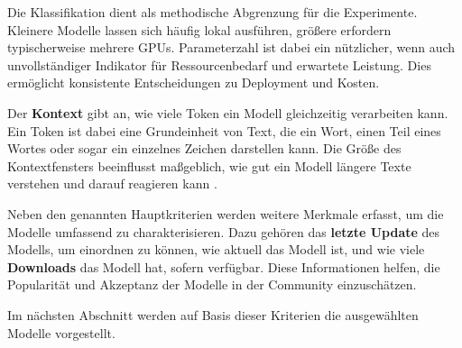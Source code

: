 Die Klassifikation dient als methodische Abgrenzung für die Experimente. Kleinere Modelle lassen sich häufig lokal ausführen, größere erfordern typischerweise mehrere GPUs. Parameterzahl ist dabei ein nützlicher, wenn auch unvollständiger Indikator für Ressourcenbedarf und erwartete Leistung. Dies ermöglicht konsistente Entscheidungen zu Deployment und Kosten.

Der \textbf{Kontext} gibt an, wie viele Token ein Modell gleichzeitig verarbeiten kann. Ein Token ist dabei eine Grundeinheit von Text, die ein Wort, einen Teil eines Wortes oder sogar ein einzelnes Zeichen darstellen kann. Die Größe des Kontextfensters beeinflusst maßgeblich, wie gut ein Modell längere Texte verstehen und darauf reagieren kann \cite{ibm-llm-context}.

Neben den genannten Hauptkriterien werden weitere Merkmale erfasst, um die Modelle umfassend zu charakterisieren. Dazu gehören das \textbf{letzte Update} des Modells, um einordnen zu können, wie aktuell das Modell ist, und wie viele \textbf{Downloads} das Modell hat, sofern verfügbar. Diese Informationen helfen, die Popularität und Akzeptanz der Modelle in der Community einzuschätzen.

Im nächsten Abschnitt werden auf Basis dieser Kriterien die ausgewählten Modelle vorgestellt.